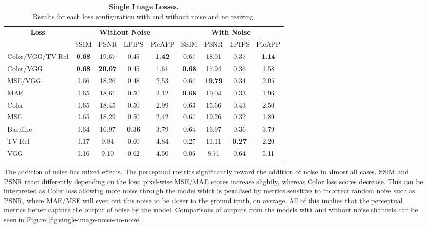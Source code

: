\begin{table}
    \centering
    \captionsetup{justification=centering}
    \caption{
        \textbf{Single Image Losses.} \\Results for each loss configuration with and without noise and no resizing.
    }
    \setlength{\tabcolsep}{0.3em}
    \begin{tabular}{l|cccc|cccc}
        \toprule
        \multicolumn{1}{c}{\textbf{Loss}}& \multicolumn{4}{c}{\textbf{Without Noise}} & \multicolumn{4}{c}{\textbf{With Noise}}\\
        \multicolumn{1}{c}{} & SSIM & PSNR & LPIPS & \multicolumn{1}{c}{PieAPP} & SSIM & PSNR & LPIPS & PieAPP \\
        \midrule
        Color/VGG/TV-Rel & \textbf{0.68} & 19.67 & 0.45 & \textbf{1.42} & 0.67 & 18.01 & 0.37 & \textbf{1.14} \\
        Color/VGG & \textbf{0.68} & \textbf{20.07} & 0.45 & 1.61 & \textbf{0.68} & 17.94 & 0.36 & 1.58 \\
        MSE/VGG & 0.66 & 18.26 & 0.48 & 2.53 & 0.67 & \textbf{19.79} & 0.34 & 2.05 \\
        MAE & 0.65 & 18.61 & 0.50 & 2.12 & \textbf{0.68} & 19.04 & 0.33 & 1.96 \\
        Color & 0.65 & 18.45 & 0.50 & 2.99 & 0.63 & 15.66 & 0.43 & 2.50 \\
        MSE & 0.65 & 18.29 & 0.50 & 2.42 & 0.67 & 19.26 & 0.32 & 1.89 \\
        Baseline & 0.64 & 16.97 & \textbf{0.36} & 3.79 & 0.64 & 16.97 & 0.36 & 3.79 \\
        \midrule
        TV-Rel & 0.17 & 9.84 & 0.60 & 4.84 & 0.27 & 11.11 & \textbf{0.27} & 2.20 \\
        VGG & 0.16 & 9.10 & 0.62 & 4.50 & 0.06 & 8.71 & 0.64 & 5.11 \\
        \bottomrule
    \end{tabular}
    
    \label{tab:single-image-losses}
\end{table}


The addition of noise has mixed effects. The perceptual metrics significantly reward the addition of noise in almost all cases. SSIM and PSNR react differently depending on the loss: pixel-wise MSE/MAE scores increase slightly, whereas Color loss scores decrease. This can be interpreted as Color loss allowing more noise through the model which is penalised by metrics sensitive to incorrect random noise such as PSNR, where MAE/MSE will even out this noise to be closer to the ground truth, on average. All of this implies that the perceptual metrics better capture the output of noise by the model. Comparisons of outputs from the models with and without noise channels can be seen in Figure \ref{fig:single-image-noise-no-noise}.

